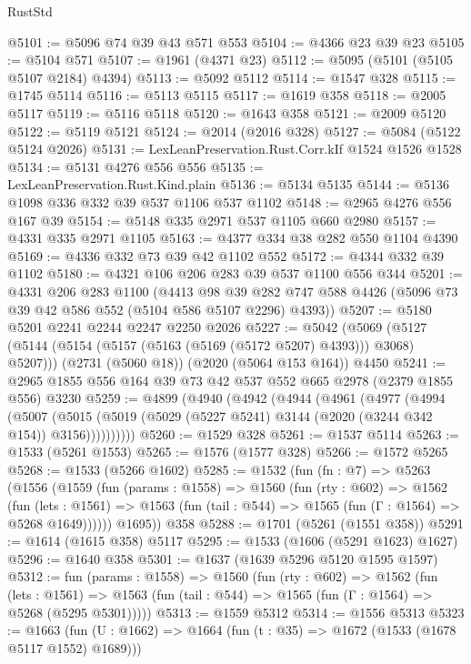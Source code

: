 \begin{lexlean}{RustStd}
\begin{coremodule}
@5101 := @5096 @74 @39 @43 @571 @553
@5104 := @4366 @23 @39 @23
@5105 := @5104 @571
@5107 := @1961 (@4371 @23)
@5112 := @5095 (@5101 (@5105 @5107 @2184) @4394)
@5113 := @5092 @5112
@5114 := @1547 @328
@5115 := @1745 @5114
@5116 := @5113 @5115
@5117 := @1619 @358
@5118 := @2005 @5117
@5119 := @5116 @5118
@5120 := @1643 @358
@5121 := @2009 @5120
@5122 := @5119 @5121
@5124 := @2014 (@2016 @328)
@5127 := @5084 (@5122 @5124 @2026)
@5131 := LexLeanPreservation.Rust.Corr.kIf @1524 @1526 @1528
@5134 := @5131 @4276 @556 @556
@5135 := LexLeanPreservation.Rust.Kind.plain
@5136 := @5134 @5135
@5144 := @5136 @1098 @336 @332 @39 @537 @1106 @537 @1102
@5148 := @2965 @4276 @556 @167 @39
@5154 := @5148 @335 @2971 @537 @1105 @660 @2980
@5157 := @4331 @335 @2971 @1105
@5163 := @4377 @334 @38 @282 @550 @1104 @4390
@5169 := @4336 @332 @73 @39 @42 @1102 @552
@5172 := @4344 @332 @39 @1102
@5180 := @4321 @106 @206 @283 @39 @537 @1100 @556 @344
@5201 := @4331
    @206
    @283
    @1100
    (@4413
      @98
      @39
      @282
      @747
      @588
      @4426
      (@5096 @73 @39 @42 @586 @552 (@5104 @586 @5107 @2296) @4393))
@5207 := @5180 @5201 @2241 @2244 @2247 @2250 @2026
@5227 := @5042
    (@5069 (@5127 (@5144 (@5154 (@5157 (@5163 (@5169 (@5172 @5207) @4393))) @3068) @5207)))
    (@2731 (@5060 @18))
    (@2020 (@5064 @153 @164))
    @4450
@5241 := @2965 @1855 @556 @164 @39 @73 @42 @537 @552 @665 @2978 (@2379 @1855 @556) @3230
@5259 := @4899
    (@4940
      (@4942
        (@4944
          (@4961
            (@4977
              (@4994
                (@5007
                  (@5015 (@5019 (@5029 (@5227 @5241) @3144 (@2020 (@3244 @342 @154)) @3156))))))))))
@5260 := @1529 @328
@5261 := @1537 @5114
@5263 := @1533 (@5261 @1553)
@5265 := @1576 (@1577 @328)
@5266 := @1572 @5265
@5268 := @1533 (@5266 @1602)
@5285 := @1532
    (fun (fn : @7) =>
    @5263
      (@1556
        (@1559
          (fun (params : @1558) =>
          @1560
            (fun (rty : @602) =>
            @1562
              (fun (lets : @1561) =>
              @1563 (fun (tail : @544) => @1565 (fun (Γ : @1564) => @5268 @1649))))))
        @1695))
    @358
@5288 := @1701 (@5261 (@1551 @358))
@5291 := @1614 (@1615 @358) @5117
@5295 := @1533 (@1606 (@5291 @1623) @1627)
@5296 := @1640 @358
@5301 := @1637 (@1639 @5296 @5120 @1595 @1597)
@5312 := fun (params : @1558) =>
  @1560
    (fun (rty : @602) =>
    @1562
      (fun (lets : @1561) =>
      @1563 (fun (tail : @544) => @1565 (fun (Γ : @1564) => @5268 (@5295 @5301)))))
@5313 := @1559 @5312
@5314 := @1556 @5313
@5323 := @1663 (fun (U : @1662) => @1664 (fun (t : @35) => @1672 (@1533 (@1678 @5117 @1552) @1689)))

\end{coremodule}
\end{lexlean}
